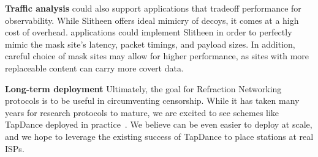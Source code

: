 \documentclass[sigconf]{acmart}
\newcommand{\TODO}[1]{\hl{TODO: #1}\xspace}
\renewcommand{\paragraph}[1]{\smallskip\noindent\textbf{#1\quad}}
\begin{document}
\paragraph{Traffic analysis}
\scheme could also support applications that tradeoff performance for
observability. While Slitheen offers ideal mimicry of decoys, it comes at a high
cost of overhead. \scheme applications could implement Slitheen
in order to perfectly mimic the mask site's latency, packet timings, and payload
sizes. In addition, careful choice of mask sites may allow for higher
performance, as sites with more replaceable content can carry more covert data.

\paragraph{Long-term deployment}
Ultimately, the goal for Refraction Networking protocols is to be useful in
circumventing censorship. While it has taken many years for research
protocols to mature, we are excited to see schemes like TapDance deployed in
practice~\cite{frolov2017isp}. We believe \scheme can be even easier to deploy
at scale, and we hope to leverage the existing success of TapDance to place \scheme
stations at real ISPs.



%



\small

\end{document}
